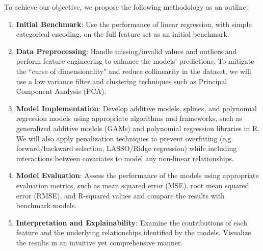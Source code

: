 \documentclass[aoas]{imsart}
\numberwithin{equation}{section}
\theoremstyle{plain}
\theoremstyle{remark}
\begin{document}
To achieve our objective, we propose the following methodology as an
outline:

\begin{enumerate}
\item
  \textbf{Initial Benchmark}: Use the performance of linear regression, with simple categorical encoding, on the full
  feature set as an initial benchmark.
  \vspace{0.2cm}
\item
  \textbf{Data Preprocessing}: Handle missing/invalid values and outliers and perform feature engineering to enhance
  the models' predictions. To mitigate the ``curse of dimensionality" and reduce collinearity in the dataset, we
   will use a low variance filter and clustering techniques such as Principal Component Analysis (PCA).
   \vspace{0.2cm}
\item
  \textbf{Model Implementation}: Develop additive models, splines, and
  polynomial regression models using appropriate algorithms and
  frameworks, such as generalized additive models (GAMs) and polynomial
  regression libraries in R. We will also apply penalization techniques
  to prevent overfitting (e.g. forward/backward selection, LASSO/Ridge regression)
  while including interactions between covariates to model any non-linear relationships.
  \vspace{0.2cm}
\item
  \textbf{Model Evaluation}: Assess the performance of the models using
  appropriate evaluation metrics, such as mean squared error (MSE), root
  mean squared error (RMSE), and R-squared values and compare the
  results with benchmark models.
  \vspace{0.2cm}
\item
  \textbf{Interpretation and Explainability}: Examine the contributions of each
  feature and the underlying relationships identified by the models. Visualize the results in an intuitive yet
  comprehensive manner.
\end{enumerate}



\end{document}
